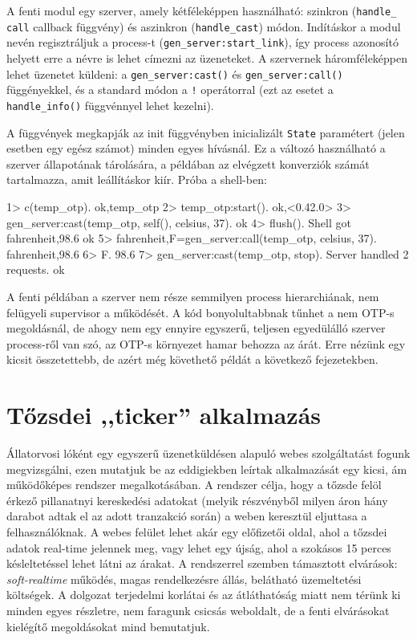 \documentclass[12pt, a4paper, oneside]{book}
\begin{document}
A fenti modul egy szerver, amely kétféleképpen használható: szinkron
(\texttt{handle\_ call} callback függvény) és aszinkron (\texttt{handle\_cast})
módon. Indításkor a modul nevén regisztráljuk a process-t
(\texttt{gen\_server:start\_link}), így process azonosító helyett erre a névre
is lehet címezni az üzeneteket. A szervernek háromféleképpen lehet üzenetet
küldeni: a \texttt{gen\_server:cast()} és \texttt{gen\_server:call()}
függényekkel, és a standard módon a \texttt{!} operátorral (ezt az esetet a
\texttt{handle\_info()} függvénnyel lehet kezelni).

A függvények megkapják az init függvényben inicializált \texttt{State}
paramétert (jelen esetben egy egész számot) minden egyes hívásnál. Ez a változó
használható a szerver állapotának tárolására, a példában az elvégzett
konverziók számát tartalmazza, amit leállításkor kiír. Próba a shell-ben:

\begin{code}{}{}
1> c(temp_otp).
{ok,temp_otp}
2> temp_otp:start().
{ok,<0.42.0>}
3> gen_server:cast(temp_otp, {self(), celsius, 37}).
ok
4> flush().
Shell got {fahrenheit,98.6}
ok
5> {fahrenheit,F}=gen_server:call(temp_otp, {celsius, 37}).
{fahrenheit,98.6}
6> F.
98.6
7> gen_server:cast(temp_otp, stop).                           
Server handled 2 requests.
ok
\end{code}

A fenti példában a szerver nem része semmilyen process hierarchiának, nem
felügyeli supervisor a működését. A kód bonyolultabbnak tűnhet a nem OTP-s
megoldásnál, de ahogy nem egy ennyire egyszerű, teljesen egyedülálló szerver
process-ről van szó, az OTP-s környezet hamar behozza az árát. Erre nézünk egy
kicsit összetettebb, de azért még követhető példát a következő fejezetekben.

\chapter{Tőzsdei ,,ticker'' alkalmazás} Állatorvosi lóként egy egyszerű
üzenetküldésen alapuló webes szolgáltatást fogunk megvizsgálni, ezen mutatjuk
be az eddigiekben leírtak alkalmazását egy kicsi, ám működőképes rendszer
megalkotásában. A rendszer célja, hogy a tőzsde felöl érkező pillanatnyi
kereskedési adatokat (melyik részvényből milyen áron hány darabot adtak el az
adott tranzakció során) a weben keresztül eljuttasa a felhasználóknak. A webes
felület lehet akár egy előfizetői oldal, ahol a tőzsdei adatok real-time
jelennek meg, vagy lehet egy újság, ahol a szokásos 15 perces késleltetéssel
lehet látni az árakat. A rendszerrel szemben támasztott elvárások:
\emph{soft-realtime} működés, magas rendelkezésre állás, belátható üzemeltetési
költségek. A dolgozat terjedelmi korlátai és az átláthatóság miatt nem térünk
ki minden egyes részletre, nem faragunk csicsás weboldalt, de a fenti
elvárásokat kielégítő megoldásokat mind bemutatjuk.
\end{document}
